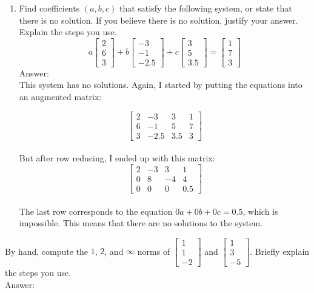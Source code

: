 \documentclass[11pt]{amsart}
\begin{document}
{\begin{enumerate}
{\begin{enumerate}
\item Find coefficients $(a, b, c)$ that satisfy the following system, or state that 
there is no solution. If you believe there is no solution, justify your answer. Explain the steps you use. 
\[
a \begin{bmatrix} 2\\6\\3\end{bmatrix} + 
b\begin{bmatrix} -3\\-1\\-2.5\end{bmatrix} + 
c\begin{bmatrix} 3 \\ 5 \\ 3.5\end{bmatrix} =
\begin{bmatrix} 1\\7\\3\end{bmatrix}
\]
Answer: \\
This system has no solutions. Again, I started by putting the equations into an augmented matrix:

$$
  \left[\begin{array}{rrr|r}
    2 & -3 & 3 & 1 \\
    6 & -1 & 5 & 7 \\
    3 & -2.5 & 3.5 & 3
  \end{array}\right]
$$ \\
But after row reducing, I ended up with this matrix: \\
$$
  \left[\begin{array}{rrr|r}
    2 & -3 & 3 & 1 \\
    0 & 8 & -4 & 4 \\
    0 & 0 & 0 & 0.5
  \end{array}\right]
$$ \\
The last row corresponds to the equation $0a + 0b + 0c = 0.5$, which is impossible. This means that there
are no solutions to the system.

\end{enumerate}

\bigskip

\item[Problem 5:] By hand, compute the $1$, $2$, and $\infty$ norms of \( \begin{bmatrix} 1\\ 1\\ -2\end{bmatrix} \) and 
 \( \begin{bmatrix} 1\\ 3\\ -5\end{bmatrix} \). Briefly explain the steps you use. \\
Answer: 

}
\end{enumerate}}
\end{document}
